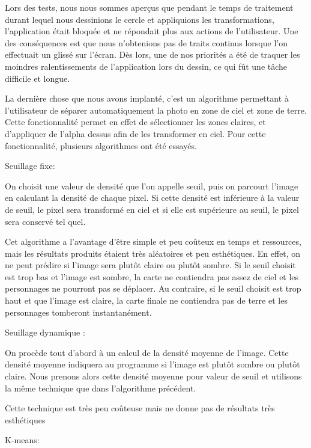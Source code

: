 \documentclass{report}
\begin{document}
Lors des tests, nous nous sommes aperçus que pendant le temps de traitement durant lequel nous dessinions le cercle et appliquions les transformations, l’application était bloquée et ne répondait plus aux actions de l’utilisateur. Une des conséquences est que nous n’obtenions pas de traits continus lorsque l’on effectuait un glissé sur l’écran. Dès lors, une de nos priorités a été de traquer les moindres ralentissements de l’application lors du dessin, ce qui fût une tâche difficile et longue.

La dernière chose que nous avons implanté, c’est un algorithme permettant à l’utilisateur de séparer automatiquement la photo en zone de ciel et zone de terre. Cette fonctionnalité permet en effet de sélectionner les zones claires, et d’appliquer de l’alpha dessus afin de les transformer en ciel. Pour cette fonctionnalité, plusieurs algorithmes ont été essayés.

Seuillage fixe:

On choisit une valeur de densité que l’on appelle seuil, puis on parcourt l’image en calculant la densité de chaque pixel. Si cette densité est inférieure à la valeur de seuil, le pixel sera transformé en ciel et si elle est supérieure au seuil, le pixel sera conservé tel quel.

Cet algorithme a l’avantage d’être simple et peu coûteux en temps et ressources, mais les résultats produits étaient très aléatoires et peu esthétiques. En effet, on ne peut prédire si l’image sera plutôt claire ou plutôt sombre. Si le seuil choisit est trop bas et l’image est sombre, la carte ne contiendra pas assez de ciel et les personnages ne pourront pas se déplacer. Au contraire, si le seuil choisit est trop haut et que l’image est claire, la carte finale ne contiendra pas de terre et les personnages tomberont instantanément.

Seuillage dynamique :

On procède tout d’abord à un calcul de la densité moyenne de l’image. Cette densité moyenne indiquera au programme si l’image est plutôt sombre ou plutôt claire. Nous prenons alors cette densité moyenne pour valeur de seuil et utilisons la même technique que dans l’algorithme précédent.

Cette technique est très peu coûteuse mais ne donne pas de résultats très esthétiques

K-means:
\end{document}
